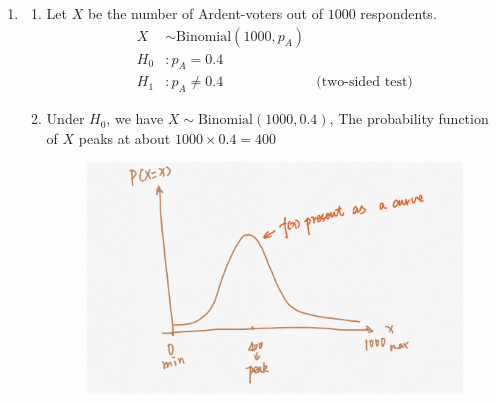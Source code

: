 \documentclass[12pt, oneside, a4paper]{article}
\begin{document}
 
	\begin{enumerate}
		\item \begin{enumerate}[label = (\alph*)]
			
			\item Let $X$ be the number of Ardent-voters out of $1000$ respondents.
			\begin{align*}
			X &\sim \text{Binomial}(1000,p_A) \\
			H_0 &: p_A = 0.4 \\
			H_1 & : p_A \neq 0.4 & \text{(two-sided test)}
			\end{align*}

			\item  Under $H_0$, we have $X \sim \text{Binomial}(1000,0.4)$, The probability function of $X$ peaks at about $1000 \times 0.4 = 400$
\begin{figure}[H]
	\centering
	\includegraphics[width=0.8\linewidth]{1b}
	\label{fig:1b}
\end{figure}
			

\end{enumerate}
\end{enumerate}
\end{document}
